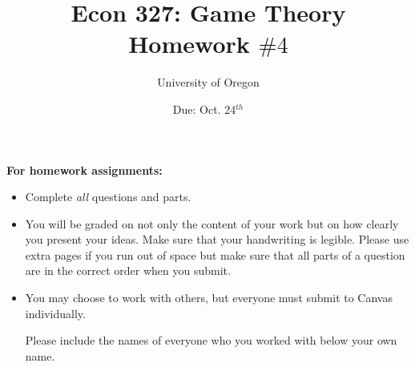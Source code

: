 \documentclass[addpoints]{exam}
\title{
    \textbf{Econ 327: Game Theory} \\ 
    Homework $\#4$
    }
\author{University of Oregon}
\date{Due: Oct. 24$^{th}$}
\begin{document}
\maketitle

\begin{center}
  \gradetable[h][questions]
\end{center}

\vspace{0.5in}

\begin{center}
  \textbf{For homework assignments:}
\end{center}

\begin{itemize}


  \item Complete \textit{all} questions and parts.


  \item You will be graded on not only the content of your work
    but on how clearly you present your ideas.
    Make sure that your handwriting is legible.
    Please use extra pages if you run out of space 
    but make sure that all parts of a question 
    are in the correct order when you submit.

  \item You may choose to work with others,
  but everyone must submit to Canvas individually.

  Please include the names of everyone who you worked with 
  below your own name.
 
\end{itemize}

\vspace{1.0in}


\vspace{0.5in}

\end{document}
